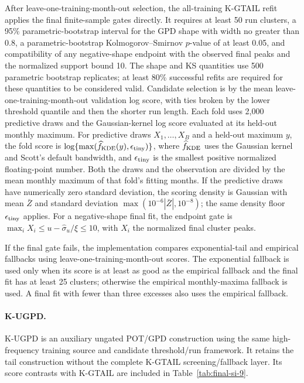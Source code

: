 \documentclass[]{interact}
\begin{document}
After leave-one-training-month-out selection, the all-training K-GTAIL
refit applies the final finite-sample gates directly. It requires at
least 50 run clusters, a 95\% parametric-bootstrap interval for the GPD
shape with width no greater than 0.8, a parametric-bootstrap
Kolmogorov--Smirnov \(p\)-value of at least 0.05, and compatibility of
any negative-shape endpoint with the observed final peaks and the
normalized support bound 10. The shape and KS quantities use 500
parametric bootstrap replicates; at least 80\% successful refits are
required for these quantities to be considered valid. Candidate
selection is by the mean leave-one-training-month-out validation log
score, with ties broken by the lower threshold quantile and then the
shorter run length. Each fold uses 2,000 predictive draws and the
Gaussian-kernel log score evaluated at its held-out monthly
maximum. For predictive draws $X_1,\ldots,X_B$ and a held-out maximum
$y$, the fold score is $\log\{\max(\widehat f_{\rm KDE}(y),
\epsilon_{\rm tiny})\}$, where $\widehat f_{\rm KDE}$ uses the
Gaussian kernel and Scott's default bandwidth, and
$\epsilon_{\rm tiny}$ is the smallest positive normalized
floating-point number. Both the draws and the observation are divided by
the mean monthly maximum of that fold's fitting months. If the
predictive draws have numerically zero standard deviation, the scoring
density is Gaussian with mean \(\bar Z\) and standard deviation
\(\max(10^{-6}|\bar Z|,10^{-8})\); the same density floor
\(\epsilon_{\rm tiny}\) applies. For a negative-shape final fit,
the endpoint gate is \(\max_i X_i\leq u-\widehat\sigma_u/\widehat\xi
\leq10\), with \(X_i\) the normalized final cluster peaks.

If the final gate fails, the implementation compares exponential-tail
and empirical fallbacks using leave-one-training-month-out scores. The
exponential fallback is used only when its score is at least as good as
the empirical fallback and the final fit has at least 25 clusters;
otherwise the empirical monthly-maxima fallback is used. A final fit
with fewer than three excesses also uses the empirical fallback.

\paragraph*{K-UGPD.}

K-UGPD is an auxiliary ungated POT/GPD construction using the same
high-frequency training source and candidate threshold/run framework.
It retains the tail construction without the complete K-GTAIL
screening/fallback layer. Its score contrasts with K-GTAIL are included
in Table~\ref{tab:final-si-9}.
\end{document}
